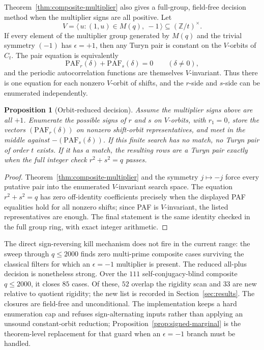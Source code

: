 \documentclass[11pt]{article}
\theoremstyle{plain}
\newtheorem{proposition}[theorem]{Proposition}
\theoremstyle{definition}
\theoremstyle{remark}
\newcommand{\Z}{\mathbb Z}
\newcommand{\paf}{\mathrm{PAF}}
\begin{document}
Theorem~\ref{thm:composite-multiplier} also gives a full-group, field-free
decision method when the multiplier signs are all positive. Let
\[
  V=\langle\,u:(1,u)\in M(q),\ -1\,\rangle\subseteq(\Z/t)^\times .
\]
If every element of the multiplier group generated by $M(q)$ and the trivial
symmetry $(-1)$ has $\epsilon=+1$, then any Turyn pair is constant on the
$V$-orbits of $C_t$. The pair equation is equivalently
\[
  \paf_r(\delta)+\paf_s(\delta)=0\qquad(\delta\ne0),
\]
and the periodic autocorrelation functions are themselves $V$-invariant. Thus
there is one equation for each nonzero $V$-orbit of shifts, and the $r$-side and
$s$-side can be enumerated independently.

\begin{proposition}[Orbit-reduced decision]\label{prop:t3-decision}
Assume the multiplier signs above are all $+1$. Enumerate the possible signs of
$r$ and $s$ on $V$-orbits, with $r_1=0$, store the vectors
$(\paf_r(\delta))$ on nonzero shift-orbit representatives, and meet in the
middle against $-(\paf_s(\delta))$. If this finite search has no match, no Turyn
pair of order $t$ exists. If it has a match, the resulting rows are a Turyn pair
exactly when the full integer check $r^2+s^2=q$ passes.
\end{proposition}

\begin{proof}
Theorem~\ref{thm:composite-multiplier} and the symmetry $j\mapsto-j$ force every
putative pair into the enumerated $V$-invariant search space. The equation
$r^2+s^2=q$ has zero off-identity coefficients precisely when the displayed PAF
equalities hold for all nonzero shifts; since PAF is $V$-invariant, the listed
representatives are enough. The final statement is the same identity checked in
the full group ring, with exact integer arithmetic.
\end{proof}

The direct sign-reversing kill mechanism does not fire in the current range:
the sweep through $q\le2000$ finds zero multi-prime composite cases surviving
the classical filters for which an $\epsilon=-1$ multiplier is present.  The
reduced all-plus decision is nonetheless strong. Over the $111$
self-conjugacy-blind composite $q\le2000$, it closes $85$ cases. Of these,
$52$ overlap the rigidity scan and $33$ are new relative to quotient rigidity;
the new list is recorded in Section~\ref{sec:results}. The closures are
field-free and unconditional.  The implementation keeps a hard enumeration cap
and refuses sign-alternating inputs rather than applying an unsound
constant-orbit reduction; Proposition~\ref{prop:signed-marginal} is the
theorem-level replacement for that guard when an $\epsilon=-1$ branch must be
handled.
\end{document}
